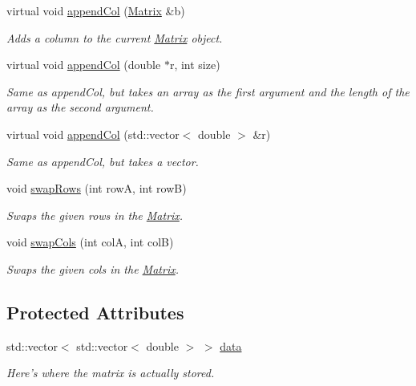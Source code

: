 \begin{DoxyCompactItemize}
virtual void \hyperlink{class_matrix_a6d7061bb02cf34f6c79a01ff25b41e84}{appendCol} (\hyperlink{class_matrix}{Matrix} \&b)
\begin{DoxyCompactList}\small\item\em Adds a column to the current \hyperlink{class_matrix}{Matrix} object. \item\end{DoxyCompactList}\item 
virtual void \hyperlink{class_matrix_aae8efe9de26740e3c953e43de55963b2}{appendCol} (double $\ast$r, int size)
\begin{DoxyCompactList}\small\item\em Same as appendCol, but takes an array as the first argument and the length of the array as the second argument. \item\end{DoxyCompactList}\item 
virtual void \hyperlink{class_matrix_a726f7ae83284c090af821752628974af}{appendCol} (std::vector$<$ double $>$ \&r)
\begin{DoxyCompactList}\small\item\em Same as appendCol, but takes a vector. \item\end{DoxyCompactList}\item 
void \hyperlink{class_matrix_ac0e73d5e98817e12b82a3f626c8343de}{swapRows} (int rowA, int rowB)
\begin{DoxyCompactList}\small\item\em Swaps the given rows in the \hyperlink{class_matrix}{Matrix}. \item\end{DoxyCompactList}\item 
void \hyperlink{class_matrix_a505f924baa7c236280751499da56ecee}{swapCols} (int colA, int colB)
\begin{DoxyCompactList}\small\item\em Swaps the given cols in the \hyperlink{class_matrix}{Matrix}. \item\end{DoxyCompactList}\end{DoxyCompactItemize}
\subsection*{Protected Attributes}
\begin{DoxyCompactItemize}
\item 
std::vector$<$ std::vector$<$ double $>$ $>$ \hyperlink{class_matrix_adab4557133e13b08ae470a8e5df7b99c}{data}
\begin{DoxyCompactList}\small\item\em Here's where the matrix is actually stored. \item\end{DoxyCompactList}\end{DoxyCompactItemize}


